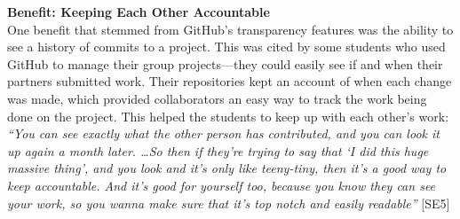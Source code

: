 %




\textbf{Benefit: Keeping Each Other Accountable} \\
One benefit that stemmed from GitHub's transparency features was the ability to see a history of commits to a project. This was cited by some students who used GitHub to manage their group projects---they could easily see if and when their partners submitted work. Their repositories kept an account of when each change was made, which provided collaborators an easy way to track the work being done on the project. This helped the students to keep up with each other's work: \textit{``You can see exactly what the other person has contributed, and you can look it up again a month later. \ldots So then if they're trying to say that `I did this huge massive thing', and you look and it's only like teeny-tiny, then it's a good way to keep accountable. And it's good for yourself too, because you know they can see your work, so you wanna make sure that it's top notch and easily readable''} [SE5]

